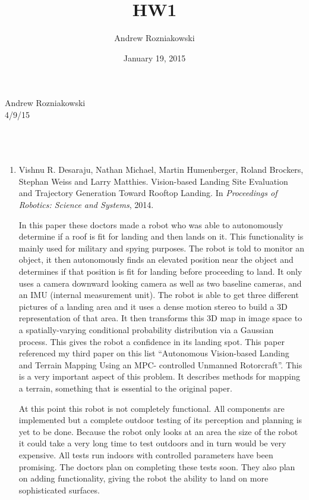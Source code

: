 \documentclass[12pt]{article}
\title{HW1}
\author{Andrew Rozniakowski}
\date{January 19, 2015}
\begin{document}
Andrew Rozniakowski \\
4/9/15 \\
\\ \\ 
\\ 
\begin{enumerate}
\item Vishnu R. Desaraju, Nathan Michael, Martin Humenberger, Roland Brockers, Stephan Weiss and Larry Matthies. Vision-based Landing Site Evaluation and Trajectory Generation Toward Rooftop Landing. In \textit{Proceedings of Robotics: Science and Systems}, 2014. \newline \newline

	 In this paper these doctors made a robot who was able to autonomously determine 
	if a roof is fit for landing and then lands on it. This functionality is 
	mainly used for military and spying purposes. The robot is told to monitor an 
	object, it then autonomously finds an elevated position near the object and 
	determines if that position is fit for landing before proceeding to land. 
	It only uses a camera downward looking camera as well as two baseline cameras, 
	and an IMU (internal measurement unit). The robot is able to get three different 		
	pictures of a landing area and it uses a dense motion stereo to build a 3D 
	representation of that area. It then transforms this 3D map in image space to a 
	spatially-varying conditional probability distribution via a Gaussian process. This 
	gives the robot a confidence in its landing spot. This paper referenced my third paper 
	on this list “Autonomous Vision-based Landing and Terrain Mapping Using an MPC-
	controlled Unmanned Rotorcraft”. This is a very important aspect of this problem. It 
	describes methods for mapping a terrain, something that is essential to the original 
	paper. \newline

	At this point this robot is not completely functional. All components are implemented 
	but a complete outdoor testing of its perception and planning is yet to be done. 
	Because the robot only looks at an area the size of the robot it could take a very 
	long time to test outdoors and in turn would be very expensive. All tests run indoors 
	with controlled parameters have been promising. The doctors plan on completing these 
	tests soon. They also plan on adding functionality, giving the robot the ability to 
	land on more sophisticated surfaces. \newline



\end{enumerate}
\end{document}
